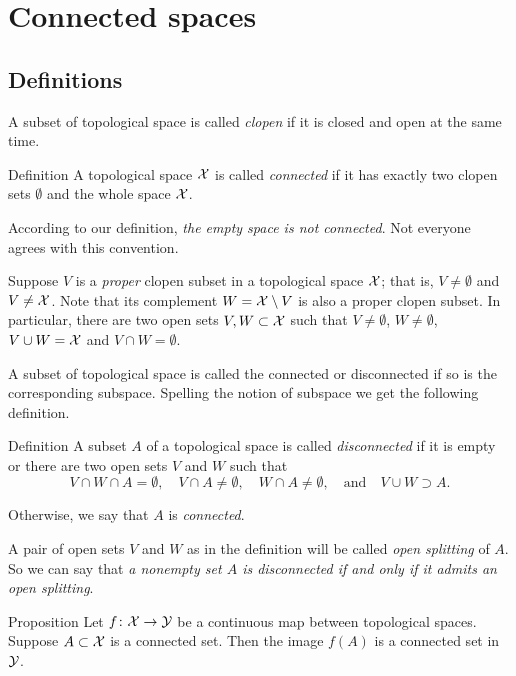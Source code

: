 \chapter{Connected spaces}

\section{Definitions}

A subset of topological space is called \emph{clopen} if it is closed and open at the same time.

\begin{thm}{Definition}
A topological space $\mathcal{X}$ is called \emph{connected} if it has exactly two clopen sets $\emptyset$ and the whole space $\mathcal{X}$.
\end{thm}

According to our definition, \textit{the empty space is not connected}.
Not everyone agrees with this convention.

Suppose $V$ is a \emph{proper} clopen subset in a topological space $\mathcal{X}$; that is, $V\ne\emptyset$ and $V\ne\mathcal{X}$.
Note that its complement $W=\mathcal{X}\setminus V$ is also a proper clopen subset.
In particular, there are two open sets $V,W\subset \mathcal{X}$ such that $V\ne\emptyset$, $W\ne\emptyset$, $V\cup W=\mathcal{X}$ and $V\cap W=\emptyset$.

A subset of topological space is called the connected or disconnected if so is the corresponding subspace.
Spelling the notion of subspace we get the following definition.

\begin{thm}{Definition}\label{def:connected-subset}
A subset $A$ of a topological space is called \emph{disconnected} if it is empty or there are two open sets $V$ and $W$ such that 
\[
V\cap W\cap A=\emptyset,\quad
V\cap A\ne\emptyset,\quad 
W\cap A\ne\emptyset,\quad\text{and}\quad 
V\cup W\supset A.\]

Otherwise, we say that $A$ is \emph{connected}.
\end{thm}

A pair of open sets $V$ and $W$ as in the definition will be called \emph{open splitting} of $A$.
So we can say that \textit{a nonempty set $A$ is disconnected if and only if it admits an open splitting}.

\begin{thm}{Proposition}\label{prop:image-connected}
Let $f\colon\mathcal{X}\to \mathcal{Y}$ be a continuous map between topological spaces.
Suppose $A\subset \mathcal{X}$ is a connected set.
Then the image $f(A)$ is a connected set in $\mathcal{Y}$.
\end{thm}

